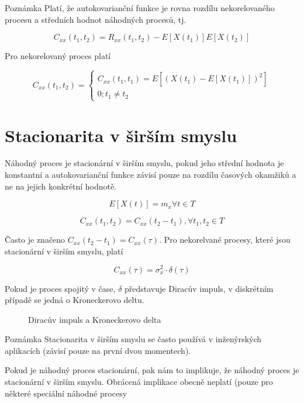 \begin{note}{Poznámka}
Platí, že autokovarianční funkce je rovna rozdílu nekorelovaného procesu a středních hodnot náhodných procesů, tj.

\[ C_{xx}(t_1,t_2) = R_{xx}(t_1,t_2) - E[X(t_1)]E[X(t_2)] \]
\end{note}

Pro nekorelovaný proces platí

\[
C_{xx}(t_1,t_2) =
\begin{cases}
	C_{xx}(t_1,t_1)=E[(X(t_1)-E[X(t_1)])^2]\\
	0; t_1\neq t_2
\end{cases}
\]

\section{Stacionarita v širším smyslu}
Náhodný proces je stacionární v širším smyslu, pokud jeho střední hodnota je konstantní a autokovarianční funkce závisí pouze na rozdílu časových okamžiků a ne na jejich konkrétní hodnotě.

\[ E[X(t)] = m_x\forall t\in T \]

\[ C_{xx}(t_1,t_2)=C_{xx}(t_2-t_1),\forall t_1,t_2\in T \]

Často je značeno $C_{xx}(t_2-t_1)=C_{xx}(\tau)$. Pro nekorelvané procesy, které jsou stacionární v širším smyslu, platí

\[ C_{xx}(\tau) = \sigma_x^2\cdot\delta(\tau) \]

Pokud je proces spojitý v čase, $\delta$ představuje Diracův impuls, v diskrétním případě se jedná o Kroneckerovo deltu.

\begin{figure}
\caption{Diracův impuls a Kroneckerovo delta}
\end{figure}

\begin{note}{Poznámka}
Stacionarita v širším smyslu se často používá v inženýrských aplikacích (závisí pouze na první dvou momentech).
\end{note}

Pokud je náhodný proces stacionární, pak nám to implikuje, že náhodný proces je stacionární v širším smyslu. Obrácená implikace obecně neplatí (pouze pro některé speciální náhodné procesy

